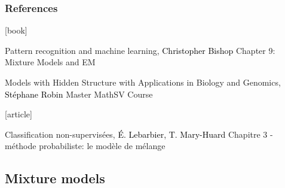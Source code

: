 \documentclass{beamer}\usepackage[]{graphicx}\usepackage[]{color}
\begin{document}
\begin{frame}
  \frametitle{References}

    \begin{thebibliography}{99}
      [book]

     Pattern recognition and machine learning,
    \newblock \textcolor{black}{Christopher Bishop}
    \newblock \alert{Chapter 9: Mixture Models and EM}

     Models with Hidden Structure with Applications in Biology and Genomics,
    \newblock \textcolor{black}{Stéphane Robin}
    \newblock \alert{Master MathSV Course}

      [article]

     Classification non-supervisées,
    \newblock \textcolor{black}{É. Lebarbier, T. Mary-Huard}
    \newblock \alert{Chapitre 3 - méthode probabiliste: le modèle de mélange}

    \end{thebibliography}


\end{frame}

\subsection{Mixture models}
\end{document}
